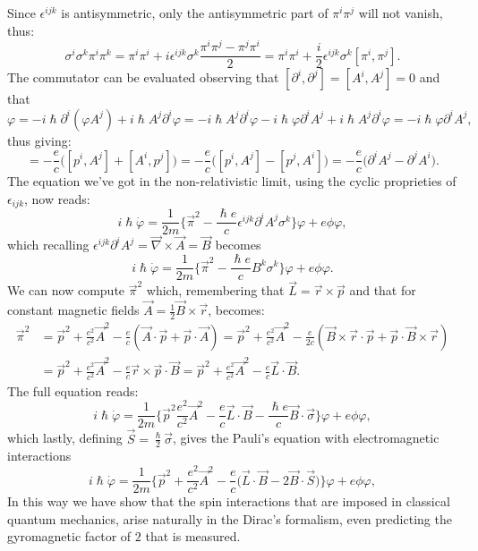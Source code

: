 Since $\epsilon^{ijk}$ is antisymmetric, only the antisymmetric part of $\pi^i\pi^j$ will not vanish, thus:
\begin{equation*}
    \sigma^i\sigma^k\pi^i\pi^k=\pi^i\pi^i+i\epsilon^{ijk}\sigma^{k}\frac{\pi^i\pi^j-\pi^j\pi^i}{2}=\pi^i\pi^i+\frac{i}{2}\epsilon^{ijk}\sigma^{k}[\pi^i,\pi^j].
\end{equation*}
The commutator can be evaluated observing that $[\partial^i,\partial^j]=[A^i,A^j]=0$ and that
\begin{equation*}
    [p^i,A^j]\varphi=-i\hslash\partial^i(\varphi A^j)+i\hslash A^j\partial^i\varphi=-i\hslash A^j\partial^i\varphi -i\hslash\varphi \partial^iA^j+i\hslash A^j\partial^i\varphi=-i\hslash\varphi \partial^iA^j,
\end{equation*}
thus giving:
\begin{equation*}
    [\pi^i,\pi^j]=-\frac{e}{c}\big([p^i,A^j]+[A^i,p^j]\big)=-\frac{e}{c}\big([p^i,A^j]-[p^j,A^i]\big)=-\frac{e}{c}\big(\partial^iA^j-\partial^jA^i\big).
\end{equation*}
The equation we've got in the non-relativistic limit, using the cyclic proprieties of $\epsilon_{ijk}$, now reads:
\begin{equation*}
    i\hslash\dot\varphi=\frac{1}{2m}\bigg\{\vec\pi^2-\frac{\hslash e}{c}\epsilon^{ijk}\partial^iA^j\sigma^k\bigg\}\varphi+e\phi\varphi,
\end{equation*}
which recalling $\epsilon^{ijk}\partial^iA^j=\vec\nabla\times\vec A=\vec B$ becomes
\begin{equation*}
    i\hslash\dot\varphi=\frac{1}{2m}\bigg\{\vec\pi^2-\frac{\hslash e}{c}B^k\sigma^k\bigg\}\varphi+e\phi\varphi.
\end{equation*}
We can now compute $\vec\pi^2$ which, remembering that $\vec L=\vec r\times\vec p$ and that for constant magnetic fields $\vec A=\frac{1}{2}\vec B\times\vec r$, becomes:
\begin{align*}
    \vec\pi^2&=\vec p^2+\frac{e^2}{c^2}\vec A^2-\frac{e}{c}(\vec A\cdot\vec p+\vec p\cdot\vec A)=\vec p^2+\frac{e^2}{c^2}\vec A^2-\frac{e}{2c}(\vec B\times\vec r\cdot\vec p+\vec p\cdot\vec B\times\vec r)\\&=\vec p^2+\frac{e^2}{c^2}\vec A^2-\frac{e}{c}\vec r\times\vec p\cdot\vec B=\vec p^2+\frac{e^2}{c^2}\vec A^2-\frac{e}{c}\vec L\cdot\vec B.
\end{align*}
The full equation reads:
\begin{equation*}
    i\hslash\dot\varphi=\frac{1}{2m}\bigg\{\vec p^2\frac{e^2}{c^2}\vec A^2-\frac{e}{c}\vec L\cdot\vec B-\frac{\hslash e}{c}\vec B\cdot\vec \sigma\bigg\}\varphi+e\phi\varphi,
\end{equation*}
which lastly, defining $\vec S=\frac{\hslash}{2}\vec\sigma$, gives the Pauli's equation with electromagnetic interactions
\begin{equation*}
    i\hslash\dot\varphi=\frac{1}{2m}\bigg\{\vec p^2+\frac{e^2}{c^2}\vec A^2-\frac{e}{c}\big(\vec L\cdot\vec B-2\vec B\cdot\vec S\big)\bigg\}\varphi+e\phi\varphi,
\end{equation*}
In this way we have show that the spin interactions that are imposed in classical quantum mechanics, arise naturally in the Dirac's formalism, even predicting the gyromagnetic factor of $2$ that is measured.

